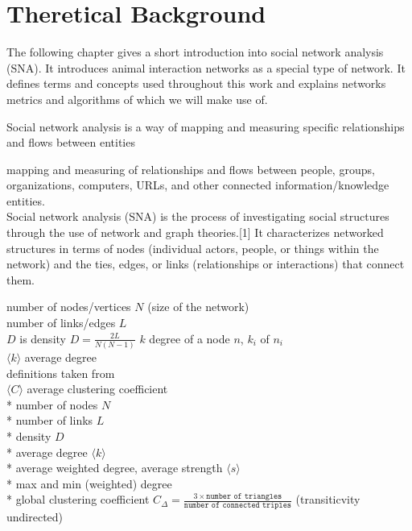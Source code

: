 \chapter{Theretical Background}
The following chapter gives a short introduction into social network analysis (SNA). It introduces animal interaction networks as a special type of network. It defines terms and concepts used throughout this work and explains networks metrics and algorithms of which we will make use of.

Social network analysis is a way of mapping and measuring specific relationships and flows between entities

mapping and measuring of relationships and flows between people, groups, organizations, computers, URLs, and other connected information/knowledge entities. 
\\
Social network analysis (SNA) is the process of investigating social structures through the use of network and graph theories.[1] It characterizes networked structures in terms of nodes (individual actors, people, or things within the network) and the ties, edges, or links (relationships or interactions) that connect them. 
 
number of nodes/vertices $N$ (size of the network)\\
number of links/edges $L$\\
$D$ is density $D=\frac{2L}{N(N-1)}$
$k$ degree of a node $n$, $k_i$ of $n_i$\\
$ \langle k  \rangle$ average degree\\
definitions taken from~\textcite{barabasi2016network}\\

$\langle C \rangle$ average clustering coefficient\\

* number of nodes $N$\\
* number of links $L$\\
* density $D$\\
* average degree $ \langle k  \rangle$\\
* average weighted degree, average strength $\langle s \rangle$\\ 
* max and min (weighted) degree\\
* global clustering coefficient $C_\Delta = \frac{3 \times \texttt{number of triangles}}{\texttt{number of connected triples}}$ (transiticvity undirected)~\cite{wasserman1994social}\\


